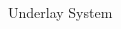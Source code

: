 \documentclass[16pt]{beamer}
\newcommand{\fs}[2]{\fontsize{#1 pt}{#2}\selectfont}
\begin{document}
\begin{frame}[t]{Underlay System}
\begin{columns}
\begin{column}{0.38\columnwidth}
		\end{column}
		\begin{column}{0.62\columnwidth}
		\fs{8}{8}
		\begin{center}
			\begin{overlayarea}{\textwidth}{4.65cm}
				\only<1>
				{	
					\vspace{3mm}
					}
\end{overlayarea}
\end{center}
\end{column}
\end{columns}
\end{frame}
\end{document}
